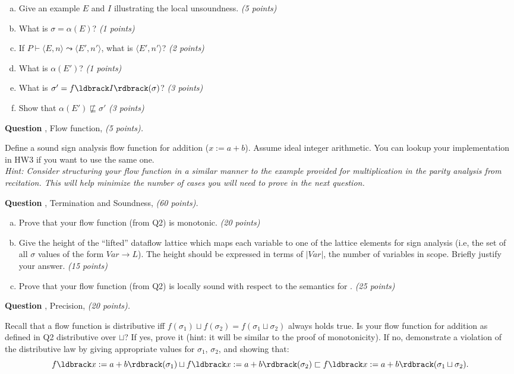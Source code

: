 \documentclass[11pt]{article}
\newcommand{\parg}[1] %
  {\ldbrack #1 \rdbrack}
\newcounter{qnum}
\newcommand{\question}[2]
  {\bigskip \noindent
  {\bf Question \arabic{qnum}}, {#1}, {\it(#2 points).}
  \addtocounter{qnum}{1}
  }
\begin{document}
\begin{enumerate}[a), labelwidth=0.7em, labelsep=0.6em, topsep=0ex, itemsep=0ex,
  parsep=0ex]

\item Give an example $E$ and $I$ illustrating the local unsoundness. \textit{(5 points)}

\item What is $\sigma=\alpha(E)$? \textit{(1 points)}

\item If $P \vdash \langle E,n \rangle \leadsto \langle E',n' \rangle$, what is $\langle E',n' \rangle$? \textit{(2 points)}

\item What is $\alpha(E')$? \textit{(1 points)}

\item What is $\sigma'=f\parg{I}(\sigma)$? \textit{(3 points)}

\item Show that $\alpha(E') \not\sqsubseteq \sigma'$ \textit{(3 points)}
\end{enumerate}

\newpage

\question{Flow function}{5} Define a sound sign analysis flow function for 
addition ($x := a + b$). Assume ideal integer arithmetic. You
can lookup your implementation in HW3 if you want to use the same one. \\

\noindent \emph{Hint: Consider structuring your flow function in a similar manner to the example provided for multiplication in the parity analysis from recitation. This will help minimize the number of cases you will need to prove in the next question.}

\question{Termination and Soundness}{60}
\begin{enumerate}[(a)]
\item Prove that your flow function (from Q2) is monotonic. \textit{(20 points)}
\item
Give the height of the ``lifted'' dataflow lattice which maps each variable to one
of the lattice elements for sign analysis (i.e, the set of all $\sigma$ values 
of the form $Var \rightarrow L$). The height should be expressed in terms of $|\textit{Var}|$, the
number of variables in scope.  Briefly justify your answer. \textit{(15 points)}
\item Prove that your flow function (from Q2) is locally sound with respect to the semantics
  for \WhileThAddr. \textit{(25 points)}
\end{enumerate}

\question{Precision}{20}

Recall that a flow function is distributive iff $f(\sigma_1) \sqcup f(\sigma_2) = f(\sigma_1 \sqcup \sigma_2)$
always holds true. Is your flow function for addition as defined in Q2 distributive over $\sqcup$? 
If yes, prove it (hint: it will be similar to the proof of monotonicity). 
If no, demonstrate a violation of the distributive law by giving appropriate values for $\sigma_1$, $\sigma_2$, and showing
that:
$$f\parg{x := a + b}(\sigma_1) \sqcup f\parg{x := a + b}(\sigma_2) \sqsubset f\parg{x := a + b}(\sigma_1 \sqcup \sigma_2).$$
\end{document}
